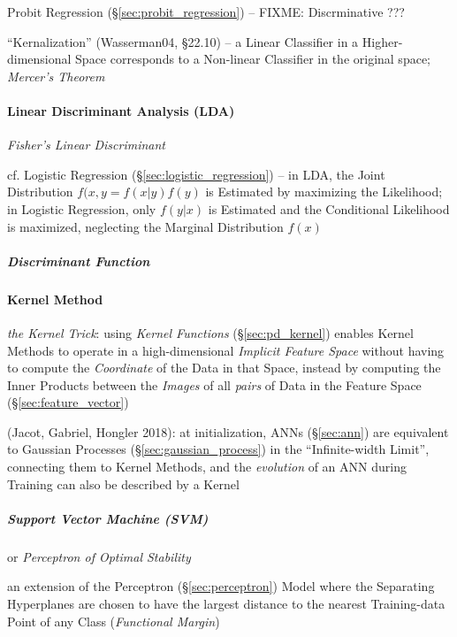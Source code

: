 Probit Regression (\S\ref{sec:probit_regression}) -- FIXME: Discrminative ???

``Kernalization'' (Wasserman04, \S22.10) -- a Linear Classifier in a
Higher-dimensional Space corresponds to a Non-linear Classifier in the original
space; \emph{Mercer's Theorem}



\paragraph{Linear Discriminant Analysis (LDA)}\label{sec:lda}\hfill

\emph{Fisher's Linear Discriminant}

cf. Logistic Regression (\S\ref{sec:logistic_regression}) -- in LDA, the Joint
Distribution $f(x,y = f(x|y)f(y)$ is Estimated by maximizing the Likelihood; in
Logistic Regression, only $f(y|x)$ is Estimated and the Conditional Likelihood
is maximized, neglecting the Marginal Distribution $f(x)$



\subparagraph{Discriminant Function}\label{sec:discriminant_function}\hfill



\paragraph{Kernel Method}\label{sec:kernel_method}\hfill

\emph{the Kernel Trick}: using \emph{Kernel Functions} (\S\ref{sec:pd_kernel})
enables Kernel Methods to operate in a high-dimensional \emph{Implicit Feature
  Space} without having to compute the \emph{Coordinate} of the Data in that
Space, instead by computing the Inner Products between the \emph{Images} of all
\emph{pairs} of Data in the Feature Space (\S\ref{sec:feature_vector})

(Jacot, Gabriel, Hongler 2018): at initialization, ANNs (\S\ref{sec:ann}) are
equivalent to Gaussian Processes (\S\ref{sec:gaussian_process}) in the
``Infinite-width Limit'', connecting them to Kernel Methods, and the
\emph{evolution} of an ANN during Training can also be described by a Kernel



\subparagraph{Support Vector Machine (SVM)}\label{sec:svm}\hfill

or \emph{Perceptron of Optimal Stability}

an extension of the Perceptron (\S\ref{sec:perceptron}) Model where the
Separating Hyperplanes are chosen to have the largest distance to the nearest
Training-data Point of any Class (\emph{Functional Margin})

